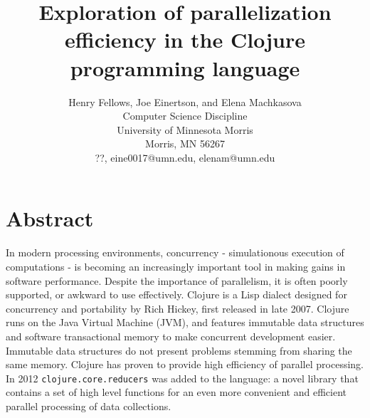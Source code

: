 \documentclass[12pt]{article}
\newcommand{\comment}[1]{{\bf \tt  {#1}}}
\newcommand{\clocode}[1]{{\texttt {#1}}}
\begin{document}
\pagestyle{plain}
%




\title{Exploration of parallelization efficiency in the Clojure programming language}
%
%




\author{
Henry Fellows, Joe Einertson, and Elena Machkasova \\
Computer Science Discipline \\
University of Minnesota Morris\\
Morris, MN 56267\\
??, eine0017@umn.edu, elenam@umn.edu
}




\date{}




\maketitle
\thispagestyle{empty}


\section*{\centering Abstract}
In modern processing environments, concurrency - simulationous execution of computations - is becoming an increasingly important tool in making gains in software performance. Despite the importance of parallelism, it is often poorly supported, or awkward to use effectively. Clojure is a Lisp dialect designed for concurrency and portability by Rich Hickey, first released in late 2007. Clojure runs on the Java Virtual Machine (JVM), and features immutable data structures and software transactional memory to make concurrent development easier. Immutable data structures do not present problems stemming from sharing the same memory. Clojure has proven to provide high efficiency of parallel processing. In 2012 \clocode{clojure.core.reducers} was added to the language: a novel library that contains a set of high level functions for an even more convenient and efficient parallel processing of data collections. 
\end{document}
